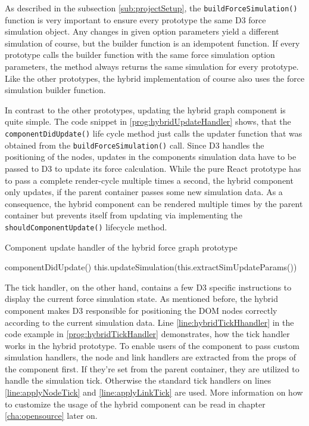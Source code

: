 As described in the subsection \ref{sub:projectSetup}, the \texttt{buildForceSimulation()} function is very important to ensure every prototype the same D3 force simulation object. Any changes in given option parameters yield a different simulation of course, but the builder function is an idempotent function. If every prototype calls the builder function with the same force simulation option parameters, the method always returns the same simulation for every prototype. Like the other prototypes, the hybrid implementation of course also uses the force simulation builder function.

In contrast to the other prototypes, updating the hybrid graph component is quite simple. The code snippet in \ref{prog:hybridUpdateHandler} shows, that the \texttt{componentDidUpdate()} life cycle method just calls the updater function that was obtained from the \texttt{buildForceSimulation()} call. Since D3 handles the positioning of the nodes, updates in the components simulation data have to be passed to D3 to update its force calculation. While the pure React prototype has to pass a complete render-cycle multiple times a second, the hybrid component only updates, if the parent container passes some new simulation data. As a consequence, the hybrid component can be rendered multiple times by the parent container but prevents itself from updating via implementing the \texttt{shouldComponentUpdate()} lifecycle method.

\begin{program}
\caption{Component update handler of the hybrid force graph prototype}
\label{prog:hybridUpdateHandler}
\begin{JsCode}
componentDidUpdate() {
  this.updateSimulation(this.extractSimUpdateParams())
}
\end{JsCode}
\end{program}

The tick handler, on the other hand, contains a few D3 specific instructions to display the current force simulation state. As mentioned before, the hybrid component makes D3 responsible for positioning the DOM nodes correctly according to the current simulation data. Line \ref{line:hybridTickHhandler} in the code example in \ref{prog:hybridTickHandler} demonstrates, how the tick handler works in the hybrid prototype. To enable users of the component to pass custom simulation handlers, the node and link handlers are extracted from the props of the component first. If they're set from the parent container, they are utilized to handle the simulation tick. Otherwise the standard tick handlers on lines \ref{line:applyNodeTick} and \ref{line:applyLinkTick} are used. More information on how to customize the usage of the hybrid component can be read in chapter \ref{cha:opensource} later on.

